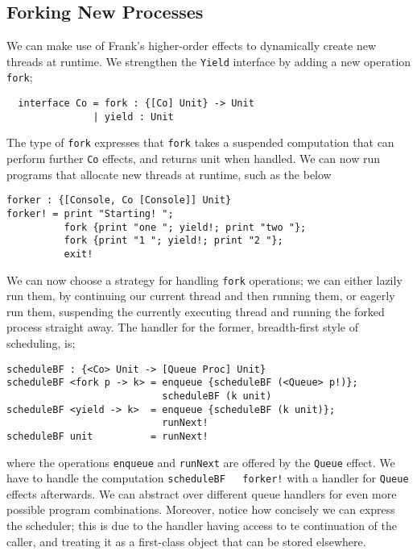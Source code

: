 \documentclass[msc,deptreport,cs]{infthesis} %
\newcommand{\code}[1]{\lstinline{#1}}
\begin{document}
\subsection{Forking New Processes}
\label{subsec:forking-new-processes}

We can make use of Frank's higher-order effects to dynamically create new
threads at runtime. We strengthen the \code{Yield} interface by adding a new
operation \code{fork};

\begin{lstlisting}
  interface Co = fork : {[Co] Unit} -> Unit
               | yield : Unit
\end{lstlisting}

The type of \code{fork} expresses that \code{fork} takes a suspended computation
that can perform further \code{Co} effects, and returns unit when handled. We
can now run programs that allocate new threads at runtime, such as the below

\begin{lstlisting}
forker : {[Console, Co [Console]] Unit}
forker! = print "Starting! ";
          fork {print "one "; yield!; print "two "};
          fork {print "1 "; yield!; print "2 "};
          exit!
\end{lstlisting}

We can now choose a strategy for handling \code{fork} operations; we can either
lazily run them, by continuing our current thread and then running them, or
eagerly run them, suspending the currently executing thread and running the
forked process straight away. The handler for the former, breadth-first style of
scheduling, is;

\begin{lstlisting}
scheduleBF : {<Co> Unit -> [Queue Proc] Unit}
scheduleBF <fork p -> k> = enqueue {scheduleBF (<Queue> p!)};
                           scheduleBF (k unit)
scheduleBF <yield -> k>  = enqueue {scheduleBF (k unit)};
                           runNext!
scheduleBF unit          = runNext!
\end{lstlisting}

\noindent where the operations \code{enqueue} and \code{runNext} are offered by
the \code{Queue} effect. We have to handle the computation \code{scheduleBF
  forker!} with a handler for \code{Queue} effects afterwards. We can abstract
over different queue handlers for even more possible program combinations.
Moreover, notice how concisely we can express the scheduler; this is due to the
handler having access to te continuation of the caller, and treating it as a
first-class object that can be stored elsewhere.
\end{document}
